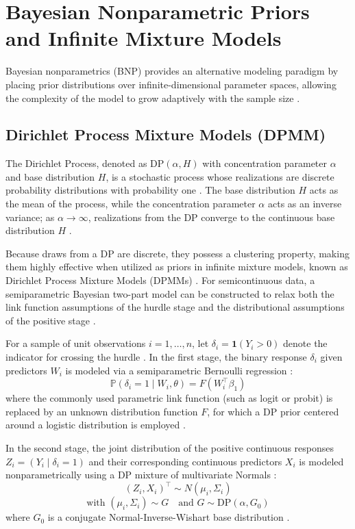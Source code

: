 \section{Bayesian Nonparametric Priors and Infinite Mixture Models}

Bayesian nonparametrics (BNP) provides an alternative modeling paradigm by placing prior distributions over infinite-dimensional parameter spaces, allowing the complexity of the model to grow adaptively with the sample size \cite{zou2006adaptive, ferguson1973, sethuraman1994}.

\subsection{Dirichlet Process Mixture Models (DPMM)}

The Dirichlet Process, denoted as $\text{DP}(\alpha, H)$ with concentration parameter $\alpha$ and base distribution $H$, is a stochastic process whose realizations are discrete probability distributions with probability one \cite{ferguson1973, sethuraman1994}. The base distribution $H$ acts as the mean of the process, while the concentration parameter $\alpha$ acts as an inverse variance; as $\alpha \to \infty$, realizations from the DP converge to the continuous base distribution $H$ \cite{ferguson1973, sethuraman1994}.

Because draws from a DP are discrete, they possess a clustering property, making them highly effective when utilized as priors in infinite mixture models, known as Dirichlet Process Mixture Models (DPMMs) \cite{ferguson1973, neal2000, escobar1995}. For semicontinuous data, a semiparametric Bayesian two-part model can be constructed to relax both the link function assumptions of the hurdle stage and the distributional assumptions of the positive stage \cite{neelon2010}.

For a sample of unit observations $i = 1, \dots, n$, let $\delta_i = \mathbf{1}(Y_i > 0)$ denote the indicator for crossing the hurdle \cite{neelon2010}. In the first stage, the binary response $\delta_i$ given predictors $W_i$ is modeled via a semiparametric Bernoulli regression \cite{neelon2010}:
\[
\mathbb{P}(\delta_i = 1 \mid W_i, \theta) = F(W_i^\top \beta_1)
\]
where the commonly used parametric link function (such as logit or probit) is replaced by an unknown distribution function $F$, for which a DP prior centered around a logistic distribution is employed \cite{neelon2010}.

In the second stage, the joint distribution of the positive continuous responses $Z_i = (Y_i \mid \delta_i = 1)$ and their corresponding continuous predictors $X_i$ is modeled nonparametrically using a DP mixture of multivariate Normals \cite{neelon2010}:
\[
(Z_i, X_i)^\top \sim N(\mu_i, \Sigma_i)
\]
\[
\text{with } (\mu_i, \Sigma_i) \sim G \quad \text{and } G \sim \text{DP}(\alpha, G_0)
\]
where $G_0$ is a conjugate Normal-Inverse-Wishart base distribution \cite{neelon2010}. 

